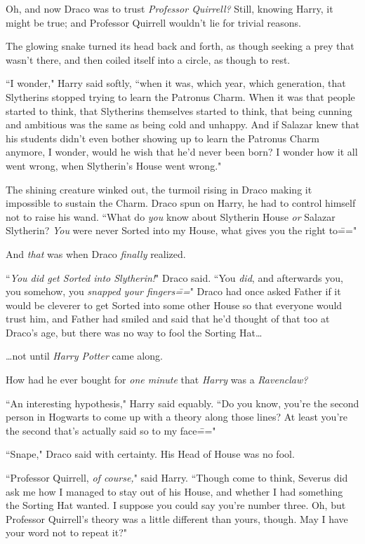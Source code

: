 Oh, and now Draco was to trust \emph{Professor Quirrell?} Still, knowing Harry, it might be true; and Professor Quirrell wouldn't lie for trivial reasons.

The glowing snake turned its head back and forth, as though seeking a prey that wasn't there, and then coiled itself into a circle, as though to rest.

``I wonder," Harry said softly, ``when it was, which year, which generation, that Slytherins stopped trying to learn the Patronus Charm. When it was that people started to think, that Slytherins themselves started to think, that being cunning and ambitious was the same as being cold and unhappy. And if Salazar knew that his students didn't even bother showing up to learn the Patronus Charm anymore, I wonder, would he wish that he'd never been born? I wonder how it all went wrong, when Slytherin's House went wrong."

The shining creature winked out, the turmoil rising in Draco making it impossible to sustain the Charm. Draco spun on Harry, he had to control himself not to raise his wand. ``What do \emph{you} know about Slytherin House \emph{or} Salazar Slytherin? \emph{You} were never Sorted into my House, what gives you the right to\==="

And \emph{that} was when Draco \emph{finally} realized.

``\emph{You did get Sorted into Slytherin!}" Draco said. ``You \emph{did}, and afterwards you, you somehow, you \emph{snapped your fingers\===}" Draco had once asked Father if it would be cleverer to get Sorted into some other House so that everyone would trust him, and Father had smiled and said that he'd thought of that too at Draco's age, but there was no way to fool the Sorting Hat{\ldots}

{\ldots}not until \emph{Harry Potter} came along.

How had he ever bought for \emph{one minute} that \emph{Harry} was a \emph{Ravenclaw?}

``An interesting hypothesis," Harry said equably. ``Do you know, you're the second person in Hogwarts to come up with a theory along those lines? At least you're the second that's actually said so to my face\==="

``Snape," Draco said with certainty. His Head of House was no fool.

``Professor Quirrell, \emph{of course,}" said Harry. ``Though come to think, Severus did ask me how I managed to stay out of his House, and whether I had something the Sorting Hat wanted. I suppose you could say you're number three. Oh, but Professor Quirrell's theory was a little different than yours, though. May I have your word not to repeat it?"

